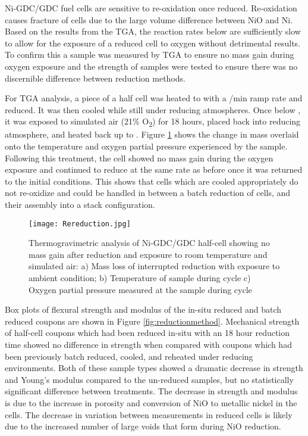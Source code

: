 Ni-GDC/GDC fuel cells are sensitive to re-oxidation once reduced.
Re-oxidation causes fracture of cells due to the large volume difference between NiO and Ni.\cite{Nakajo2012}
Based on the results from the TGA, the reaction rates below  are sufficiently slow to allow for the exposure of a reduced cell to oxygen without detrimental results.\cite{Richardson2003}
To confirm this a sample was measured by TGA to ensure no mass gain during oxygen exposure and the strength of samples were tested to ensure there was no discernible difference between reduction methods.

For TGA analysis, a piece of a half cell was heated to  with a
/min ramp rate and reduced.
It was then cooled while still under reducing atmospheres.
Once below , it was exposed to simulated air
(21\% O\textsubscript{2}) for 18 hours, placed back into reducing atmosphere, and heated back up to .
Figure \ref{fig:rereduction} shows the change in mass overlaid onto the temperature and oxygen partial pressure experienced by the sample.
Following this treatment, the cell showed no mass gain during the oxygen exposure and continued to reduce at the same rate as before once it was returned to the initial conditions.
This shows that cells which are cooled appropriately do not re-oxidize and could be handled in between a batch reduction of cells, and their assembly into a stack configuration.

\begin{figure}
    \texttt{[image: Rereduction.jpg]}
    \caption{Thermogravimetric analysis of Ni-GDC/GDC half-cell showing no mass gain after reduction and exposure to room temperature and simulated air: a) Mass loss of interrupted reduction with exposure to ambient condition; b) Temperature of sample during cycle c) Oxygen partial pressure measured at the sample during cycle}
    \label{fig:rereduction}
\end{figure}

Box plots of flexural strength and modulus of the in-situ reduced and batch reduced coupons are shown in Figure \ref{fig:reductionmethod}.
Mechanical strength of half-cell coupons which had been reduced in-situ with an 18 hour reduction time showed no difference in strength when compared with coupons which had been previously batch reduced, cooled, and reheated under reducing environments.
Both of these sample types showed a dramatic decrease in strength and Young's modulus compared to the un-reduced samples, but no statistically significant difference between treatments.
The decrease in strength and modulus is due to the increase in porosity and conversion of NiO to metallic nickel in the cells.
The decrease in variation between measurements in reduced cells is likely due to the increased number of large voids that form during NiO reduction.

